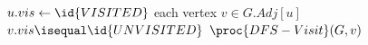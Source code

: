 \begin{codebox}
\li $u.vis \gets \id{VISITED}$
\li \For each vertex $v \in G.Adj[u]$
\li \Do \If $v.vis \isequal \id{UNVISITED}$
\li \Then $\proc{DFS-Visit}(G, v)$ \End \End
\end{codebox}